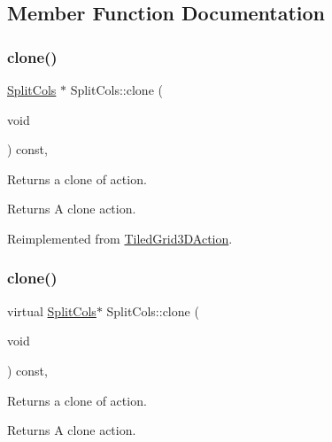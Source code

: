 \subsection{Member Function Documentation}
\mbox{\label{classSplitCols_a97e5eee11d109590c63b1c542a90f01e}} 
\subsubsection{\texorpdfstring{clone()}{clone()}\hspace{0.1cm}{\footnotesize\ttfamily [1/2]}}
{\footnotesize\ttfamily \hyperlink{classSplitCols}{Split\+Cols} $\ast$ Split\+Cols\+::clone (\begin{DoxyParamCaption}\item[{void}]{ }\end{DoxyParamCaption}) const\hspace{0.3cm}{\ttfamily [override]}, {\ttfamily [virtual]}}

Returns a clone of action.

\begin{DoxyReturn}{Returns}
A clone action. 
\end{DoxyReturn}


Reimplemented from \hyperlink{classTiledGrid3DAction_a689fd377cc0abae91db7def106529b53}{Tiled\+Grid3\+D\+Action}.

\mbox{\label{classSplitCols_a209bd3c8ad9be47a9e9959bf9dc8afdf}} 
\subsubsection{\texorpdfstring{clone()}{clone()}\hspace{0.1cm}{\footnotesize\ttfamily [2/2]}}
{\footnotesize\ttfamily virtual \hyperlink{classSplitCols}{Split\+Cols}$\ast$ Split\+Cols\+::clone (\begin{DoxyParamCaption}\item[{void}]{ }\end{DoxyParamCaption}) const\hspace{0.3cm}{\ttfamily [override]}, {\ttfamily [virtual]}}

Returns a clone of action.

\begin{DoxyReturn}{Returns}
A clone action. 
\end{DoxyReturn}



